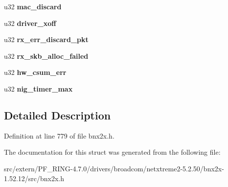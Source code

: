 \begin{DoxyCompactItemize}
\item 
\hypertarget{structbnx2x__eth__stats_a49a209ca8df2ddd295a35aa511e1059f}{
u32 {\bfseries mac\_\-discard}}
\label{structbnx2x__eth__stats_a49a209ca8df2ddd295a35aa511e1059f}

\item 
\hypertarget{structbnx2x__eth__stats_a4c03f82223794b1df26fb5262835201c}{
u32 {\bfseries driver\_\-xoff}}
\label{structbnx2x__eth__stats_a4c03f82223794b1df26fb5262835201c}

\item 
\hypertarget{structbnx2x__eth__stats_afc00a319d3e7b9d91e3f217cc4b1ac41}{
u32 {\bfseries rx\_\-err\_\-discard\_\-pkt}}
\label{structbnx2x__eth__stats_afc00a319d3e7b9d91e3f217cc4b1ac41}

\item 
\hypertarget{structbnx2x__eth__stats_aac6b5750ca220e495711b856ed39d92f}{
u32 {\bfseries rx\_\-skb\_\-alloc\_\-failed}}
\label{structbnx2x__eth__stats_aac6b5750ca220e495711b856ed39d92f}

\item 
\hypertarget{structbnx2x__eth__stats_a8d5ce1ac2c5bb0ec0cdd169332e07ddf}{
u32 {\bfseries hw\_\-csum\_\-err}}
\label{structbnx2x__eth__stats_a8d5ce1ac2c5bb0ec0cdd169332e07ddf}

\item 
\hypertarget{structbnx2x__eth__stats_ab64002aec696bea5cace53cabe1fa8b6}{
u32 {\bfseries nig\_\-timer\_\-max}}
\label{structbnx2x__eth__stats_ab64002aec696bea5cace53cabe1fa8b6}

\end{DoxyCompactItemize}


\subsection{Detailed Description}


Definition at line 779 of file bnx2x.h.



The documentation for this struct was generated from the following file:\begin{DoxyCompactItemize}
\item 
src/extern/PF\_\-RING-\/4.7.0/drivers/broadcom/netxtreme2-\/5.2.50/bnx2x-\/1.52.12/src/bnx2x.h\end{DoxyCompactItemize}
